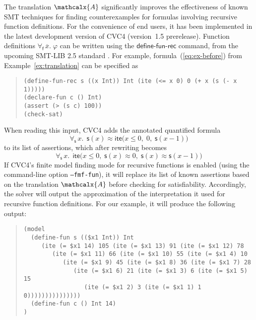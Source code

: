 \documentclass[runningheads,a4paper]{llncs}
\newcommand{\con}[1]{\mathsf{#1}}
\renewcommand\vec[1]{\overline{#1}}
\newcommand\cvc{CVC4\xspace}
\newcommand{\teq}{\approx}
\newcommand{\conv}{\mathcalx{A}}
\newcommand{\lite}{\con{ite}}
\newcommand{\forallf}[1]{\forall_{\!#1\:}}
\newcommand{\rem}[1]{\textcolor{red}{[#1]}}
\newcommand{\ajr}[1]{\rem{#1 --ajr}}
\newcommand{\jb}[1]{\rem{#1 --jb}}
\newcommand{\definefunreccmd}{\con{define}\text{-}\con{fun}\text{-}\con{rec}}
\begin{document}
The translation $\conv$ significantly improves the effectiveness of known SMT
techniques for finding counterexamples for formulas involving recursive
function definitions.
For the convenience of end users, it
has been implemented in the latest development version of \cvc %
(version~1.5 prerelease).
Function definitions $\forallf{\con{f}} \vec x.\; \varphi$ can be written using the $\definefunreccmd$ command,
from the upcoming SMT-LIB 2.5 standard \cite{smtlib25}.
For example, formula~(\ref{eq:ex-before}) from Example~\ref{ex:translation}
can be specified as
%
\begin{quote}
\begin{verbatim}
(define-fun-rec s ((x Int)) Int (ite (<= x 0) 0 (+ x (s (- x 1)))))
(declare-fun c () Int)
(assert (> (s c) 100))
(check-sat)
\end{verbatim}
\end{quote}
%
When reading this input,
\cvc adds the annotated quantified formula
$$\forallf{\con{s}} x.\;\, \con{s}( x ) \teq \lite\bigl( x \leq 0,\; 0,\; \con{s}( x-1 )\bigr)$$
to its list of assertions,
which after rewriting becomes
$$\forallf{\con{s}} x.\;\, \lite\bigl( x \leq 0,\; \con{s}( x ) \teq 0,\; \con{s}( x ) \teq \con{s}( x-1 ) \bigr)$$
If \cvc's finite model finding mode for recursive functions is enabled (using
the command-line option \texttt{--fmf-fun}), it will replace its list of known
assertions based on the translation $\conv$ before checking for satisfiability.
Accordingly, the solver will output the approximation of the interpretation it
used for recursive function definitions. For our example, it will produce the following output:
%
\begin{quote}
\begin{verbatim}
(model
  (define-fun s (($x1 Int)) Int 
     (ite (= $x1 14) 105 (ite (= $x1 13) 91 (ite (= $x1 12) 78 
        (ite (= $x1 11) 66 (ite (= $x1 10) 55 (ite (= $x1 4) 10 
           (ite (= $x1 9) 45 (ite (= $x1 8) 36 (ite (= $x1 7) 28 
              (ite (= $x1 6) 21 (ite (= $x1 3) 6 (ite (= $x1 5) 15 
                 (ite (= $x1 2) 3 (ite (= $x1 1) 1 0)))))))))))))))
  (define-fun c () Int 14)
)
\end{verbatim}
\end{quote}
\end{document}
